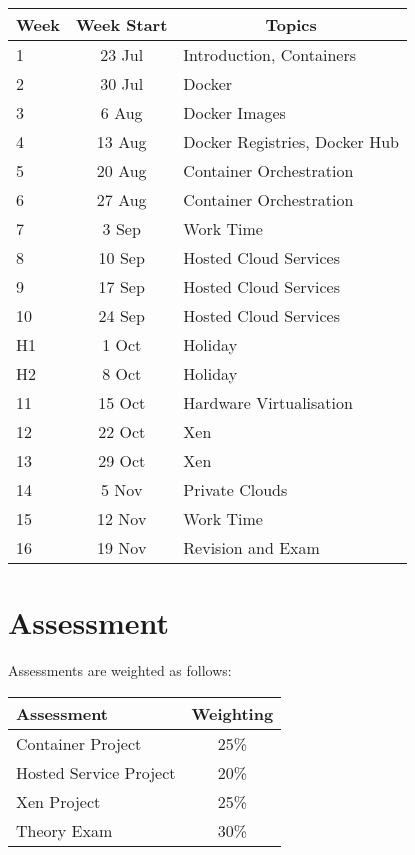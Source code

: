 \documentclass{article}
\begin{document}
\renewcommand{\arraystretch}{1.5}
\begin{tabular}{|l|c|l|}
\hline
 Week & Week Start & \multicolumn{1}{c|}{Topics}             \\ \hline
 1    & 23 Jul     & Introduction, Containers                 \\ \hline
 2    & 30 Jul     & Docker                                   \\ \hline
 3    &  6 Aug     & Docker Images                            \\ \hline
 4    & 13 Aug     & Docker Registries, Docker Hub            \\ \hline
 5    & 20 Aug     & Container Orchestration                  \\ \hline
 6    & 27 Aug     & Container Orchestration                 \\ \hline
 7    & 3 Sep     & Work Time                               \\ \hline
 8    &  10 Sep     & Hosted Cloud Services                           \\ \hline
 9    & 17 Sep     & Hosted Cloud Services                                   \\ \hline
 10   & 24 Sep     & Hosted Cloud Services                              \\ \hline
 H1   & 1 Oct     & Holiday                                  \\ \hline
 H2   &  8 Oct     & Holiday                                  \\ \hline
 11   & 15 Oct     &  Hardware Virtualisation                              \\ \hline
 12   & 22 Oct     & Xen                                \\ \hline
 13   & 29 Oct     & Xen                               \\ \hline
 14   &  5 Nov     & Private Clouds                               \\ \hline
 15   &  12 Nov     & Work Time                               \\ \hline
 16   & 19 Nov     & Revision and Exam                       \\ \hline
\end{tabular}

\section*{Assessment}

Assessments are weighted as follows: \\
\begin{tabular}{|l|c|}
\hline
Assessment                  &  Weighting \\ \hline
Container Project           &  25\% \\ \hline
Hosted Service Project                 &  20\% \\ \hline
Xen Project           &  25\% \\ \hline
Theory Exam                 &  30\% \\ \hline
\end{tabular}
\end{document}
